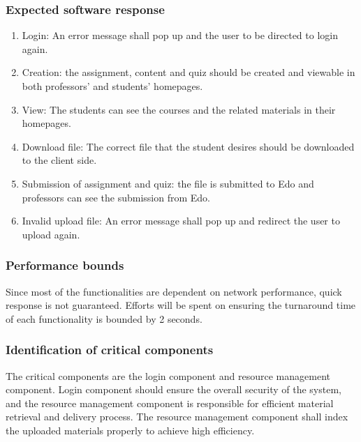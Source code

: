 \documentclass[paper=a4, fontsize=11pt]{scrartcl}
\numberwithin{equation}{section}		%
\numberwithin{figure}{section}			%
\numberwithin{table}{section}				%
\begin{document}
\subsubsection{Expected software response}
\begin{enumerate}
	\item Login: An error message shall pop up and the user to be directed to login again.
	\item Creation: the assignment, content and quiz should be created and viewable in both professors' and students' homepages.
	\item View: The students can see the courses and the related materials in their homepages.
	\item Download file: The correct file that the student desires should be downloaded to the client side.
	\item Submission of assignment and quiz: the file is submitted to Edo and professors can see the submission from Edo.
	\item Invalid upload file: An error message shall pop up and redirect the user to upload again.
\end{enumerate}

\subsubsection{Performance bounds}
Since most of the functionalities are dependent on network performance, quick response is not guaranteed. Efforts will be spent on ensuring the turnaround time of each functionality is bounded by 2 seconds. 

\subsubsection{Identification of critical components}
The critical components are the login component and resource management component. Login component should ensure the overall security of the system, and the resource management component is responsible for efficient material retrieval and delivery process. The resource management component shall index the uploaded materials properly to achieve high efficiency.
\end{document}
